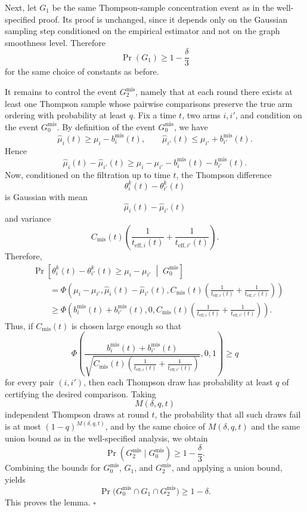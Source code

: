 \documentclass{article}
\begin{document}
Next, let $G_1$ be the same Thompson-sample concentration event as in the
well-specified proof. Its proof is unchanged, since it depends only on the
Gaussian sampling step conditioned on the empirical estimator and not on the
graph smoothness level. Therefore
\[
\Pr(G_1) \ge 1-\frac{\delta}{3}
\]
for the same choice of constants as before.

It remains to control the event $G_2^{\mathrm{mis}}$, namely that at each round
there exists at least one Thompson sample whose pairwise comparisons preserve
the true arm ordering with probability at least $q$. Fix a time $t$, two arms
$i,i'$, and condition on the event $G_0^{\mathrm{mis}}$. By definition of the
event $G_0^{\mathrm{mis}}$, we have
\[
\widehat\mu_i(t) \ge \mu_i - b_i^{\mathrm{mis}}(t),
\qquad
\widehat\mu_{i'}(t) \le \mu_{i'} + b_{i'}^{\mathrm{mis}}(t).
\]
Hence
\[
\widehat\mu_i(t)-\widehat\mu_{i'}(t)
\ge
\mu_i-\mu_{i'}-b_i^{\mathrm{mis}}(t)-b_{i'}^{\mathrm{mis}}(t).
\]
Now, conditioned on the filtration up to time $t$, the Thompson difference
\[
\theta_i^k(t)-\theta_{i'}^k(t)
\]
is Gaussian with mean
\[
\widehat\mu_i(t)-\widehat\mu_{i'}(t)
\]
and variance
\[
C_{\mathrm{mis}}(t)
\left(
\frac{1}{t_{\mathrm{eff},i}(t)}+\frac{1}{t_{\mathrm{eff},i'}(t)}
\right).
\]
Therefore,
\begin{align*}
&\Pr\!\left[
\theta_i^k(t)-\theta_{i'}^k(t)\ge \mu_i-\mu_{i'}
\;\middle|\; G_0^{\mathrm{mis}}
\right]
\\
&\qquad =
\Phi\!\left(
\mu_i-\mu_{i'},
\widehat\mu_i(t)-\widehat\mu_{i'}(t),
C_{\mathrm{mis}}(t)\left(
\frac{1}{t_{\mathrm{eff},i}(t)}+\frac{1}{t_{\mathrm{eff},i'}(t)}
\right)
\right)
\\
&\qquad \ge
\Phi\!\left(
b_i^{\mathrm{mis}}(t)+b_{i'}^{\mathrm{mis}}(t),
0,
C_{\mathrm{mis}}(t)\left(
\frac{1}{t_{\mathrm{eff},i}(t)}+\frac{1}{t_{\mathrm{eff},i'}(t)}
\right)
\right).
\end{align*}
Thus, if $C_{\mathrm{mis}}(t)$ is chosen large enough so that
\[
\Phi\!\left(
\frac{
b_i^{\mathrm{mis}}(t)+b_{i'}^{\mathrm{mis}}(t)
}{
\sqrt{
C_{\mathrm{mis}}(t)\left(
\frac{1}{t_{\mathrm{eff},i}(t)}+\frac{1}{t_{\mathrm{eff},i'}(t)}
\right)
}
},
0,1
\right)\ge q
\]
for every pair $(i,i')$, then each Thompson draw has probability at least $q$
of certifying the desired comparison. Taking
\[
M(\delta,q,t)
\]
independent Thompson draws at round $t$, the probability that all such draws
fail is at most $(1-q)^{M(\delta,q,t)}$, and by the same choice of
$M(\delta,q,t)$ and the same union bound as in the well-specified analysis, we
obtain
\[
\Pr(G_2^{\mathrm{mis}} \mid G_0^{\mathrm{mis}}) \ge 1-\frac{\delta}{3}.
\]
Combining the bounds for $G_0^{\mathrm{mis}}$, $G_1$, and
$G_2^{\mathrm{mis}}$, and applying a union bound, yields
\[
\Pr\!\bigl(G_0^{\mathrm{mis}}\cap G_1\cap G_2^{\mathrm{mis}}\bigr)\ge 1-\delta.
\]
This proves the lemma. \hfill$\square$
\end{document}

